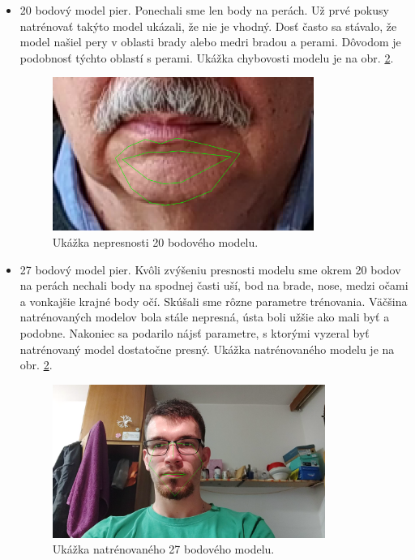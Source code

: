 \begin{itemize}
	\item 20 bodový model pier. 
	Ponechali sme len body na perách. 
	Už prvé pokusy natrénovať takýto model ukázali, že nie je vhodný.
	Dosť často sa stávalo, že model našiel pery v oblasti brady alebo medri bradou a perami.
	Dôvodom je podobnosť týchto oblastí s perami. 
	Ukážka chybovosti modelu je na obr. \ref{pic-nepresnostModeluLenUsta}.
	
\begin{figure}[H]
	\begin{center}
		\includegraphics[height=5cm]{pics/nepresnostModeluLenUsta.png}
		\caption{Ukážka nepresnosti 20 bodového modelu.}
		\label{pic-nepresnostModeluLenUsta}
	\end{center}
\end{figure}

	\item 27 bodový model pier.
	Kvôli zvýšeniu presnosti modelu sme okrem 20 bodov na perách nechali body na spodnej časti uší, bod na brade, nose, medzi očami a vonkajšie krajné body očí.
	Skúšali sme rôzne parametre trénovania. 
	Väčšina natrénovaných modelov bola stále nepresná, ústa boli užšie ako mali byť a podobne.
	Nakoniec sa podarilo nájsť parametre, s ktorými vyzeral byť natrénovaný model dostatočne presný.
	Ukážka natrénovaného modelu je na obr. \ref{pic-nepresnostModeluLenUsta}.
	
\begin{figure}[H]
	\begin{center}
		\includegraphics[height=5cm]{pics/ukazka27modelu.png}
		\caption{Ukážka natrénovaného 27 bodového modelu.}
		\label{pic-nepresnostModeluLenUsta}
	\end{center}
\end{figure}

\end{itemize}

